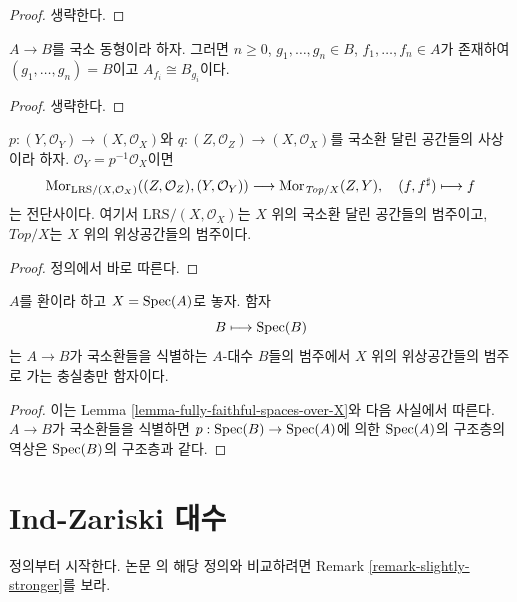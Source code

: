 \begin{proof}
생략한다.
\end{proof}

\begin{lemma}
\label{lemma-structure-local-isomorphism}
$A \to B$를 국소 동형이라 하자. 그러면
$n \geq 0$, $g_1, \ldots, g_n \in B$, $f_1, \ldots, f_n \in A$가 존재하여
$(g_1, \ldots, g_n) = B$이고 $A_{f_i} \cong B_{g_i}$이다.
\end{lemma}

\begin{proof}
생략한다.
\end{proof}

\begin{lemma}
\label{lemma-fully-faithful-spaces-over-X}
$p : (Y, \mathcal{O}_Y) \to (X, \mathcal{O}_X)$와
$q : (Z, \mathcal{O}_Z) \to (X, \mathcal{O}_X)$를
국소환 달린 공간들의 사상이라 하자.
$\mathcal{O}_Y = p^{-1}\mathcal{O}_X$이면
$$
\mathop{\mathrm{Mor}}\nolimits_{\text{LRS}/(X, \mathcal{O}_X)}((Z, \mathcal{O}_Z), (Y, \mathcal{O}_Y))
\longrightarrow
\mathop{\mathrm{Mor}}\nolimits_{\textit{Top}/X}(Z, Y),\quad
(f, f^\sharp) \longmapsto f
$$
는 전단사이다. 여기서 $\text{LRS}/(X, \mathcal{O}_X)$는
$X$ 위의 국소환 달린 공간들의 범주이고, $\textit{Top}/X$는
$X$ 위의 위상공간들의 범주이다.
\end{lemma}

\begin{proof}
정의에서 바로 따른다.
\end{proof}

\begin{lemma}
\label{lemma-local-isomorphism-fully-faithful}
$A$를 환이라 하고 $X = \mathop{\mathrm{Spec}}(A)$로 놓자. 함자
$$
B \longmapsto \mathop{\mathrm{Spec}}(B)
$$
는 $A \to B$가 국소환들을 식별하는 $A$-대수 $B$들의 범주에서
$X$ 위의 위상공간들의 범주로 가는 충실충만 함자이다.
\end{lemma}

\begin{proof}
이는 Lemma \ref{lemma-fully-faithful-spaces-over-X}와 다음 사실에서 따른다.
$A \to B$가 국소환들을 식별하면
$p : \mathop{\mathrm{Spec}}(B) \to \mathop{\mathrm{Spec}}(A)$에 의한 $\mathop{\mathrm{Spec}}(A)$의 구조층의 역상은
$\mathop{\mathrm{Spec}}(B)$의 구조층과 같다.
\end{proof}




\section{Ind-Zariski 대수}
\label{section-ind-zariski}

\noindent
정의부터 시작한다. 논문 \cite{BS}의 해당 정의와 비교하려면
Remark \ref{remark-slightly-stronger}를 보라.

